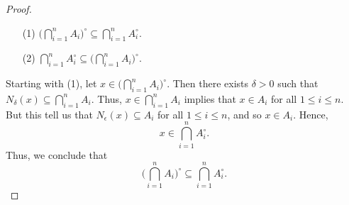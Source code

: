 \documentclass[a4paper]{article}
\begin{document}
\begin{enumerate}
\begin{enumerate}
\begin{proof}
                    \begin{enumerate}
                        \item[(1)] \( \Big(  \bigcap_{ i=1  }^{ n }  {A}_{i} \Big)^{\circ} \subseteq \bigcap_{ i=1 }^{ n }  {A}_{i}^{\circ} \).
                        \item[(2)] \( \bigcap_{ i=1 }^{ n }  {A}_{i}^{\circ} \subseteq \Big(  \bigcap_{ i=1  }^{ n }  {A}_{i} \Big)^{\circ} \). 
                    \end{enumerate}
           Starting with (1), let \( x \in \Big(  \bigcap_{ i=1 }^{ n }  {A}_{i} \Big)^{\circ}  \). Then there exists \( \delta > 0  \) such that \( {N}_{\delta}(x) \subseteq \bigcap_{  i =1  }^{ n }  {A}_{i}  \). Thus, \( x \in \bigcap_{ i=1 }^{ n } {A}_{i} \) implies that \( x \in {A}_{i} \) for all \( 1 \leq i \leq n \). But this tell us that \( {N}_{\epsilon}(x) \subseteq {A}_{i} \) for all \( 1 \leq i \leq n  \), and so \( x \in A_{i} \). Hence,  
           \[  x \in \bigcap_{ i=1 }^{ n } {A}_{i}^{\circ}. \]
           Thus, we conclude that 
           \[  \Big(  \bigcap_{ i=1 }^{ n } {A}_{i} \Big)^{\circ} \subseteq \bigcap_{ i=1 }^{ n } {A}_{i}^{\circ}. \]


\end{proof}
\end{enumerate}
\end{enumerate}
\end{document}
